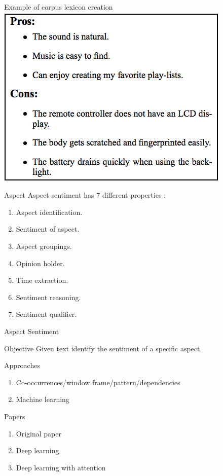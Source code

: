 \documentclass[10pt]{beamer}
\begin{document}
\begin{frame}{Example of corpus lexicon creation}
  \centering
  \includegraphics[scale=0.4]{examples/pros_cons.png}\cite{Kaji07}
\end{frame}

\begin{frame}{Aspect}
Aspect sentiment has 7 different properties \cite{ding08,liu2015sentiment}:
\begin{enumerate}
\item Aspect identification.
\item Sentiment of aspect.
\item Aspect groupings.
\item Opinion holder.
\item Time extraction.
\item Sentiment reasoning.
\item Sentiment qualifier.
\end{enumerate}

\end{frame}

\begin{frame}{Aspect Sentiment}
  \begin{block}{Objective}
  Given text identify the sentiment of a specific aspect.
  \end{block}
  \begin{block}{Approaches}
    \begin{enumerate}
      \item Co-occurrences/window frame/pattern/dependencies \cite{Nasukawa03}
      \item Machine learning \cite{Ruder16,Wang16}
    \end{enumerate}
  \end{block}
  \begin{block}{Papers}
    \begin{enumerate}
      \item Original paper \cite{Nasukawa03}
      \item Deep learning \cite{Ruder16}
      \item Deep learning with attention \cite{Wang16}
    \end{enumerate}
  \end{block}
\end{frame}
\end{document}
